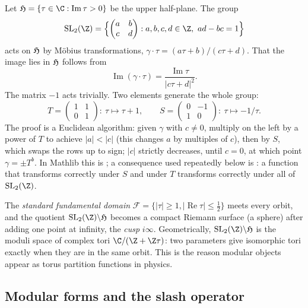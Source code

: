 Let $\chfiveH = \{\tau\in\C : \operatorname{Im}\tau > 0\}$ be the upper half-plane. The group
\begin{equation*}
  \chfiveSL = \Bigl\{\begin{pmatrix} a & b\\ c & d\end{pmatrix} : a,b,c,d\in\Z,\ ad - bc = 1\Bigr\}
\end{equation*}
acts on $\mathfrak{H}$ by M\"obius transformations, $\gamma\cdot\tau = (a\tau+b)/(c\tau+d)$. That the
image lies in $\mathfrak{H}$ follows from
\begin{equation}\label{ch05:eq:imag}
  \operatorname{Im}(\gamma\cdot\tau) = \frac{\operatorname{Im}\tau}{|c\tau+d|^2}.
\end{equation}
The matrix $-1$ acts trivially. Two elements generate the whole group:
\begin{equation*}
  T = \begin{pmatrix}1&1\\0&1\end{pmatrix}:\ \tau\mapsto \tau+1, \qquad
  S = \begin{pmatrix}0&-1\\1&0\end{pmatrix}:\ \tau\mapsto -1/\tau .
\end{equation*}
The proof is a Euclidean algorithm: given $\gamma$ with $c\ne 0$, multiply on the left by a power
of $T$ to achieve $|a|<|c|$ (this changes $a$ by multiples of $c$), then by $S$, which swaps the
rows up to sign; $|c|$ strictly decreases, until $c = 0$, at which point $\gamma = \pm T^b$. In Mathlib
this is ; a consequence used repeatedly below is
: a function that transforms correctly
under $S$ and under $T$ transforms correctly under all of $\chfiveSL$.

The \emph{standard fundamental domain} $\mathcal F = \{|\tau|\ge 1, |\operatorname{Re}\tau|\le
\tfrac12\}$ meets every orbit, and the quotient $\chfiveSL\backslash\chfiveH$ becomes a compact
Riemann surface (a sphere) after adding one point at infinity, the \emph{cusp} $i\infty$.
Geometrically, $\chfiveSL\backslash\chfiveH$ is the moduli space of complex tori
$\C/(\Z+\Z\tau)$: two parameters give isomorphic tori exactly when they are in the same orbit. This
is the reason modular objects appear as torus partition functions in physics.

\subsection{Modular forms and the slash operator}

